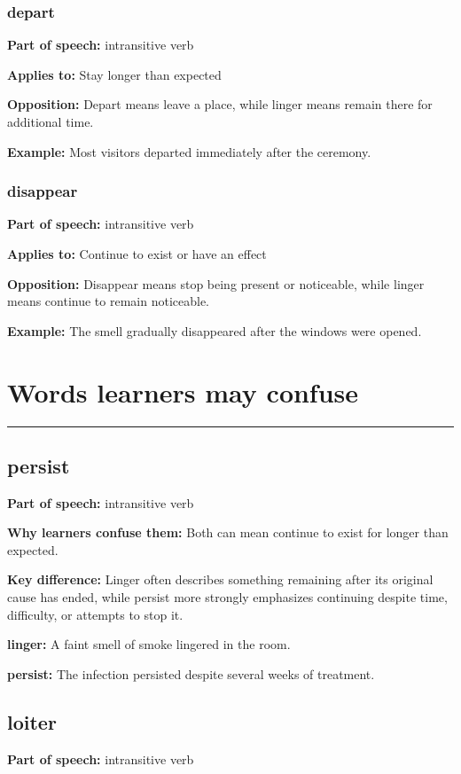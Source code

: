 \documentclass[11pt]{article}
\newcommand{\sectionrule}{\par\vspace{-0.5em}\noindent\textcolor{Accent}{\rule{\linewidth}{0.6pt}}\par}
\begin{document}
\subsubsection{depart}
\textbf{Part of speech:} intransitive verb

\textbf{Applies to:} Stay longer than expected

\textbf{Opposition:} Depart means leave a place, while linger means remain there for additional time.

\textbf{Example:} Most visitors departed immediately after the ceremony.

\subsubsection{disappear}
\textbf{Part of speech:} intransitive verb

\textbf{Applies to:} Continue to exist or have an effect

\textbf{Opposition:} Disappear means stop being present or noticeable, while linger means continue to remain noticeable.

\textbf{Example:} The smell gradually disappeared after the windows were opened.

\section{Words learners may confuse}
\sectionrule
\subsection{persist}
\textbf{Part of speech:} intransitive verb

\textbf{Why learners confuse them:} Both can mean continue to exist for longer than expected.

\textbf{Key difference:} Linger often describes something remaining after its original cause has ended, while persist more strongly emphasizes continuing despite time, difficulty, or attempts to stop it.

\textbf{linger:} A faint smell of smoke lingered in the room.

\textbf{persist:} The infection persisted despite several weeks of treatment.

\subsection{loiter}
\textbf{Part of speech:} intransitive verb
\end{document}
